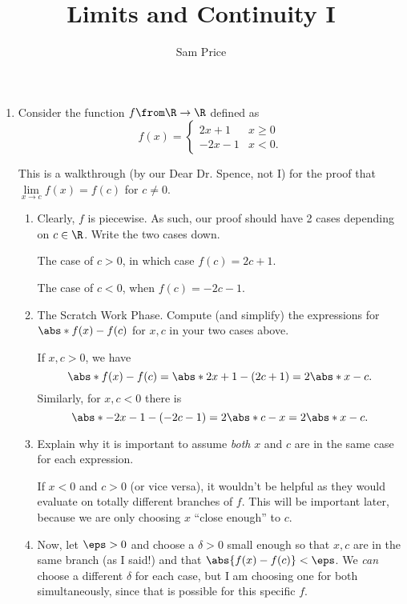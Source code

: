 \documentclass{article}
\author{Sam Price}
\date{}
\title{Limits and Continuity I}
\begin{document}
\maketitle

\begin{enumerate}

  \item Consider the function $f\from \R \to \R$ defined as
        \[
        f(x) = \begin{cases}
          2x + 1 & x \ge 0\\
          -2x - 1 & x < 0.
        \end{cases}
        \]

        This is a walkthrough (by our Dear Dr. Spence, not I) for the proof that $\lim\limits_{x \to c} f(x) = f(c)$ for $c \ne 0$.

        \begin{enumerate}

          \item Clearly, $f$ is piecewise. As such, our proof should have 2 cases depending on $c \in \R$. Write the two cases down.

                The case of $c > 0$, in which case $f(c) = 2c+1$.

                The case of $c < 0$, when $f(c) = -2c - 1$.

          \item The Scratch Work Phase. Compute (and simplify) the expressions for $\abs*{f(x) - f(c)}$ for $x, c$ in your two cases above.

                If $x,c > 0$, we have
                \[ \abs*{f(x) - f(c)} = \abs*{2x + 1 - (2c + 1)} = 2\abs*{x - c}. \]
                Similarly, for $x, c < 0$ there is
                \[ \abs*{- 2x - 1 - (-2c - 1)} = 2\abs*{c - x} = 2\abs*{x - c}. \]

          \item Explain why it is important to assume \emph{both} $x$ and $c$ are in the same case for each expression.

                If $x < 0$ and $c > 0$ (or vice versa), it wouldn't be helpful as they would evaluate on totally different branches of $f$.
                This will be important later, because we are only choosing $x$ ``close enough'' to $c$.

          \item Now, let $\eps > 0$ and choose a $\delta > 0$ small enough so that $x, c$ are in the same branch (as I said!)
                and that $\abs{f(x) - f(c)} < \eps$. We \emph{can} choose a different $\delta$ for each case, but I am choosing one for both
                simultaneously, since that is possible for this specific $f$.


\end{enumerate}
\end{enumerate}
\end{document}

